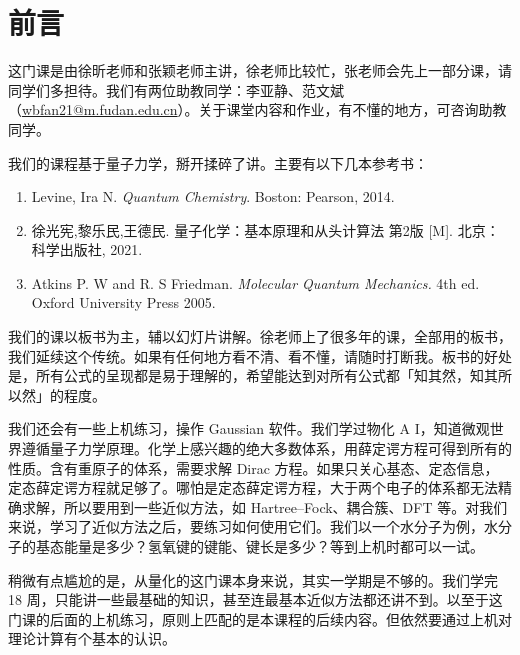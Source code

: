 \section{前言}

这门课是由徐昕老师和张颖老师主讲，徐老师比较忙，张老师会先上一部分课，请同学们多担待。我们有两位助教同学：李亚静、范文斌（\url{wbfan21@m.fudan.edu.cn}）。关于课堂内容和作业，有不懂的地方，可咨询助教同学。

我们的课程基于量子力学，掰开揉碎了讲。主要有以下几本参考书：
\begin{enumerate}
    \item  Levine, Ira N. \emph{Quantum Chemistry}. Boston: Pearson, 2014. 
    \item  徐光宪,黎乐民,王德民. 量子化学：基本原理和从头计算法 第2版 [M]. 北京：科学出版社, 2021. 
    \item  Atkins P. W and R. S Friedman. \emph{Molecular Quantum Mechanics.} 4th ed. Oxford University Press 2005.
\end{enumerate}

我们的课以板书为主，辅以幻灯片讲解。徐老师上了很多年的课，全部用的板书，我们延续这个传统。如果有任何地方看不清、看不懂，请随时打断我。板书的好处是，所有公式的呈现都是易于理解的，希望能达到对所有公式都「知其然，知其所以然」的程度。

我们还会有一些上机练习，操作 Gaussian 软件。我们学过物化 A I，知道微观世界遵循量子力学原理。化学上感兴趣的绝大多数体系，用薛定谔方程可得到所有的性质。含有重原子的体系，需要求解 Dirac 方程。如果只关心基态、定态信息，定态薛定谔方程就足够了。哪怕是定态薛定谔方程，大于两个电子的体系都无法精确求解，所以要用到一些近似方法，如 Hartree--Fock、耦合簇、DFT 等。对我们来说，学习了近似方法之后，要练习如何使用它们。我们以一个水分子为例，水分子的基态能量是多少？氢氧键的键能、键长是多少？等到上机时都可以一试。

稍微有点尴尬的是，从量化的这门课本身来说，其实一学期是不够的。我们学完 18 周，只能讲一些最基础的知识，甚至连最基本近似方法都还讲不到。以至于这门课的后面的上机练习，原则上匹配的是本课程的后续内容。但依然要通过上机对理论计算有个基本的认识。

